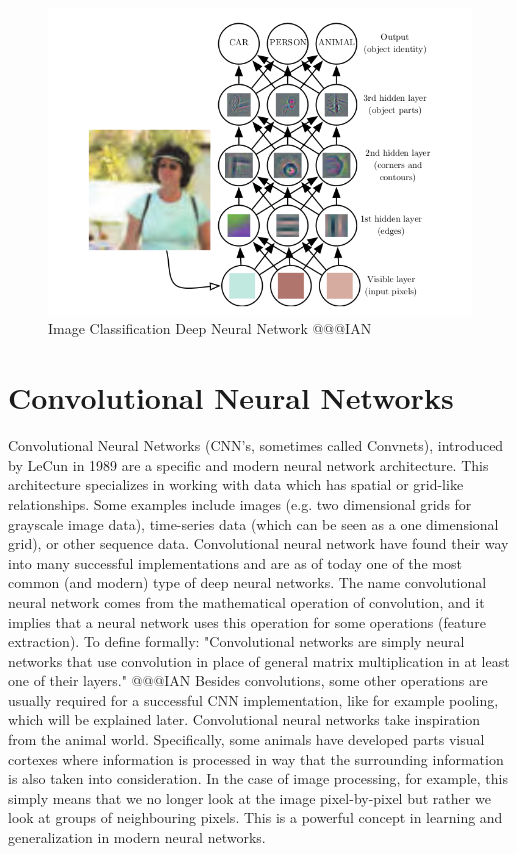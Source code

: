 \documentclass[b5paper]{book}
\begin{document}
\begin{figure}
    \centering
    \includegraphics[scale=0.5]{figures/image-classification.png}
    \caption{Image Classification Deep Neural Network @@@IAN}
    \label{fig:dnn_classify}
\end{figure}

\section{Convolutional Neural Networks}

Convolutional Neural Networks (CNN's, sometimes called Convnets), introduced by LeCun in 1989 are a specific and modern neural network architecture. This architecture specializes in working with data which has spatial or grid-like relationships. Some examples include images (e.g. two dimensional grids for grayscale image data), time-series data (which can be seen as a one dimensional grid), or other sequence data. Convolutional neural network have found their way into many successful implementations and are as of today one of the most common (and modern) type of deep neural networks. The name convolutional neural network comes from the mathematical operation of convolution, and it implies that a neural network uses this operation for some operations (feature extraction). To define formally: "Convolutional networks are simply neural networks that use convolution in place of general matrix multiplication in at least one of their layers." @@@IAN Besides convolutions, some other operations are usually required for a successful CNN implementation, like for example pooling, which will be explained later. Convolutional neural networks take inspiration from the animal world. Specifically, some animals have developed parts visual cortexes where information is processed in way that the surrounding information is also taken into consideration. In the case of image processing, for example, this simply means that we no longer look at the image pixel-by-pixel but rather we look at groups of neighbouring pixels. This is a powerful concept in learning and generalization in modern neural networks.
\end{document}
